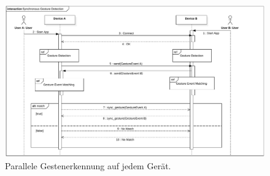 \begin{figure}
\centering
\includegraphics[width=1\textwidth]{bilder/sync_gesture_detection_alt_b}
\caption{Parallele Gestenerkennung auf jedem Gerät.}
\label{fig:sync_gesture_detection_alt_b}
\end{figure}

